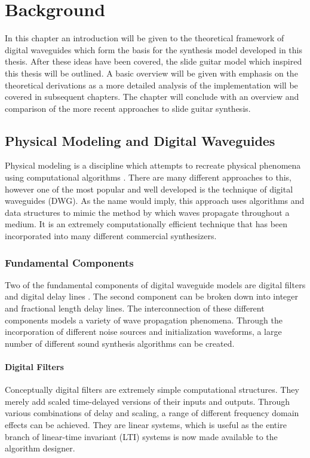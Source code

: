 \documentclass[main.tex]{subfiles}
\begin{document}
\chapter{Background}
In this chapter an introduction will be given to the theoretical framework of digital waveguides which form the basis for the synthesis model developed in this thesis. After these ideas have been covered, the slide guitar model which inspired this thesis will be outlined. A basic overview will be given with emphasis on the theoretical derivations as a more detailed analysis of the implementation will be covered in subsequent chapters. The chapter will conclude with an overview and comparison of the more recent approaches to slide guitar synthesis.

\section{Physical Modeling and Digital Waveguides}
Physical modeling is a discipline which attempts to recreate physical phenomena using computational algorithms . There are many different approaches to this, however one of the most popular and well developed is the technique of digital waveguides (DWG). As the name would imply, this approach uses algorithms and data structures to mimic the method by which waves propagate throughout a medium. It is an extremely computationally efficient technique that has been incorporated into many different commercial synthesizers.

\subsection{Fundamental Components}
Two of the fundamental components of digital waveguide models are digital filters and digital delay lines . The second component can be broken down into integer and fractional length delay lines. The interconnection of these different components models a variety of wave propagation phenomena. Through the incorporation of different noise sources and initialization waveforms, a large number of different sound synthesis algorithms can be created.

\subsubsection{Digital Filters}
Conceptually digital filters are extremely simple computational structures. They merely add scaled time-delayed versions of their inputs and outputs. Through various combinations of delay and scaling, a range of different frequency domain effects can be achieved. They are linear systems, which is useful as the entire branch of linear-time invariant (LTI) systems is now made available to the algorithm designer.
\end{document}
